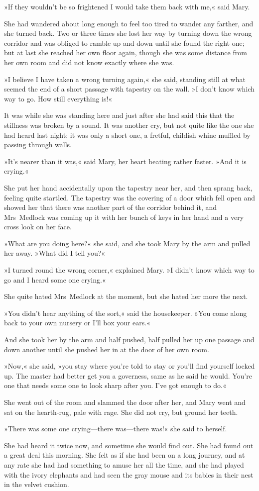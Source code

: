 »If they wouldn't be so frightened I would take them back with me,« said Mary.

She had wandered about long enough to feel too tired to wander any farther, and she turned back. Two or three times she lost her way by turning down the wrong corridor and was obliged to ramble up and down until she found the right one; but at last she reached her own floor again, though she was some distance from her own room and did not know exactly where she was.

»I believe I have taken a wrong turning again,« she said, standing still at what seemed the end of a short passage with tapestry on the wall. »I don't know which way to go. How still everything is!«

It was while she was standing here and just after she had said this that the stillness was broken by a sound. It was another cry, but not quite like the one she had heard last night; it was only a short one, a fretful, childish whine muffled by passing through walls.

»It's nearer than it was,« said Mary, her heart beating rather faster. »And it is crying.«

She put her hand accidentally upon the tapestry near her, and then sprang back, feeling quite startled. The tapestry was the covering of a door which fell open and showed her that there was another part of the corridor behind it, and Mrs~Medlock was coming up it with her bunch of keys in her hand and a very cross look on her face.

»What are you doing here?« she said, and she took Mary by the arm and pulled her away. »What did I tell you?«

»I turned round the wrong corner,« explained Mary. »I didn't know which way to go and I heard some one crying.«

She quite hated Mrs~Medlock at the moment, but she hated her more the next.

»You didn't hear anything of the sort,« said the housekeeper. »You come along back to your own nursery or I'll box your ears.«

And she took her by the arm and half pushed, half pulled her up one passage and down another until she pushed her in at the door of her own room.

»Now,« she said, »you stay where you're told to stay or you'll find yourself locked up. The master had better get you a governess, same as he said he would. You're one that needs some one to look sharp after you. I've got enough to do.«

She went out of the room and slammed the door after her, and Mary went and sat on the hearth-rug, pale with rage. She did not cry, but ground her teeth.

»There was some one crying—there was—there was!« she said to herself.

She had heard it twice now, and sometime she would find out. She had found out a great deal this morning. She felt as if she had been on a long journey, and at any rate she had had something to amuse her all the time, and she had played with the ivory elephants and had seen the gray mouse and its babies in their nest in the velvet cushion.